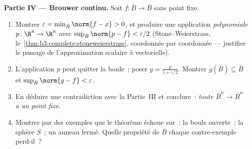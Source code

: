 \begin{problem}
\medskip
\noindent\textbf{Partie IV --- Brouwer continu.} Soit
$f\colon\bar B\to\bar B$  sans point fixe.
\begin{enumerate}[resume]
  \item Montrer $\varepsilon = \min_{\bar B}\norm{f - x} >
        0$, et produire une application
        \emph{polynomiale} $p\colon\R^n\to \R^n$ avec
        $\sup_{\bar B}\norm{p - f} < \varepsilon/2$
        (Stone--Weierstrass,
        le~\cref{thm:b3:complete:stoneweierstrass}, coordonnée
        par coordonnée --- justifier le passage de
        l'approximation scalaire à vectorielle).
  \item L'application $p$ peut quitter la boule~; poser $g =
        \frac{p}{1 + \varepsilon/2}$. Montrer $g(\bar B)
        \subseteq \bar B$ et $\sup_{\bar B}\norm{g - f} <
        \varepsilon$.
  \item En déduire une contradiction avec la Partie~III et
        conclure~: \emph{toute  $\bar
        B^n \to \bar B^n$ a un point fixe.}
  \item Montrer par des exemples que le théorème échoue sur~:
        la boule ouverte~; la sphère $S$~; un anneau fermé.
        Quelle propriété de $\bar B$ chaque contre-exemple
        perd-il~?
\end{enumerate}


\end{problem}

